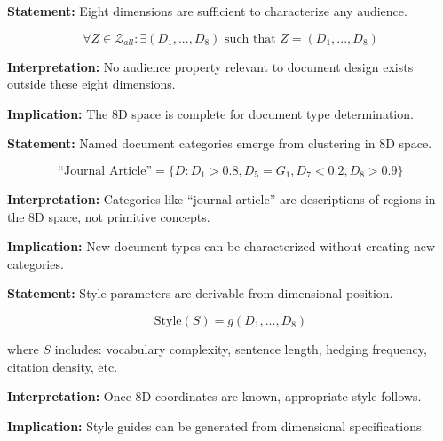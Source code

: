 \begin{tcolorbox}[colback=gray!5!white, colframe=gray!75!black,
    title=Axiom DT-2: Dimensional Sufficiency]
\textbf{Statement:} Eight dimensions are sufficient to characterize any audience.

\begin{equation}
\forall Z \in \mathcal{Z}_{all}: \exists (D_1, ..., D_8) \text{ such that } Z = (D_1, ..., D_8)
\end{equation}

\textbf{Interpretation:} No audience property relevant to document design
exists outside these eight dimensions.

\textbf{Implication:} The 8D space is complete for document type determination.
\end{tcolorbox}

\begin{tcolorbox}[colback=gray!5!white, colframe=gray!75!black,
    title=Axiom DT-3: Category Emergence]
\textbf{Statement:} Named document categories emerge from clustering in 8D space.

\begin{equation}
\text{``Journal Article''} = \{D : D_1 > 0.8, D_5 = G_1, D_7 < 0.2, D_8 > 0.9\}
\end{equation}

\textbf{Interpretation:} Categories like ``journal article'' are descriptions
of regions in the 8D space, not primitive concepts.

\textbf{Implication:} New document types can be characterized without
creating new categories.
\end{tcolorbox}

\begin{tcolorbox}[colback=gray!5!white, colframe=gray!75!black,
    title=Axiom DT-4: Style Derivation]
\textbf{Statement:} Style parameters are derivable from dimensional position.

\begin{equation}
\text{Style}(S) = g(D_1, ..., D_8)
\end{equation}

where $S$ includes: vocabulary complexity, sentence length, hedging frequency,
citation density, etc.

\textbf{Interpretation:} Once 8D coordinates are known, appropriate style follows.

\textbf{Implication:} Style guides can be generated from dimensional specifications.
\end{tcolorbox}

